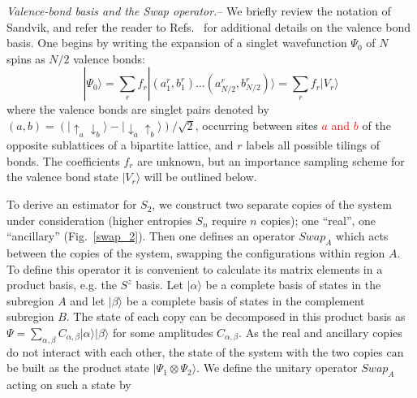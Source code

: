 \documentclass[prl,aps,twocolumn,floatfix,amsmath,amssymb,superscriptaddress,tightenlines]{revtex4}
\begin{document}
{\it Valence-bond basis and the Swap operator.}-- We briefly review the notation of Sandvik, and refer the reader to 
Refs.~\cite{Sandvik,Beach,AWSloop} for additional details on the valence bond basis.
One begins by writing the expansion of a singlet
wavefunction $\Psi_0$ of $N$ spins as $N/2$ valence bonds:
\begin{equation}
| \Psi_0 \rangle = \sum_r f_r|(a^r_1,b^r_1) \ldots (a^r_{N/2},b^r_{N/2}) \rangle = \sum_r f_r| V_r \rangle
\end{equation}
where the valence bonds are singlet pairs denoted by $(a,b) = (\lvert\uparrow_a \downarrow_b \rangle - \lvert\downarrow_a \uparrow_b\rangle)/\sqrt{2}$,
occurring between sites \textcolor{red}{$a$ and $b$} of the opposite sublattices of a bipartite lattice, and $r$ labels all possible tilings of bonds.  The coefficients $f_r$ are unknown, but an importance sampling scheme \cite{Sandvik} for the valence bond state $| V_r \rangle$ will be outlined below.  

%
%
To derive an estimator for $S_2$, we construct two separate copies of the
system under consideration (higher entropies $S_n$ require $n$ copies);
one ``real'', one ``ancillary'' (Fig.~\ref{swap_2}). Then one defines an
operator $Swap_A$ which acts between the copies of the system, swapping
the configurations within region $A$.  To define this operator it is
convenient to calculate its matrix elements in a product basis, e.g.  the
$S^z$ basis.  Let $|\alpha\rangle$  be a complete basis of states in the
subregion $A$ and let $|\beta\rangle$ be a complete basis of states in the
complement subregion $B$. The state of each copy can be decomposed
in this product basis as $\Psi=\sum_{\alpha,\beta} C_{\alpha,\beta}
|\alpha\rangle | \beta \rangle$ for some amplitudes $C_{\alpha,\beta}$. As
the real and ancillary copies do not interact with each other, the state
of the system with the two copies can be built as the product state
$|\Psi_1 \otimes \Psi_2\rangle$. We define the unitary operator $Swap_A$
acting on such a state by
\end{document}
